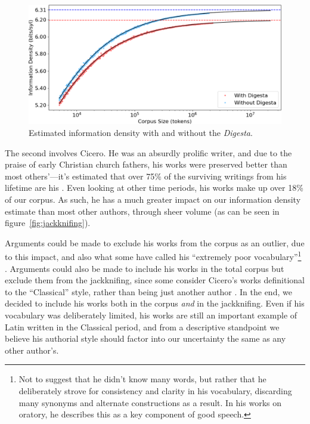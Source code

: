 \documentclass[12pt,twoside]{article}
\begin{document}
\begin{figure}[h]
\centering
\noindent\includegraphics[width=\linewidth]{digesta}
\caption{Estimated information density with and without the \emph{Digesta}.}
\label{fig:digesta}
\end{figure}

The second involves Cicero. He was an absurdly prolific writer, and due to the praise of early Christian church fathers, his works were preserved better than most others'---it's estimated that over 75\% of the surviving writings from his lifetime are his \citep{harrison}. Even looking at other time periods, his works make up over 18\% of our corpus. As such, he has a much greater impact on our information density estimate than most other authors, through sheer volume (as can be seen in figure~\ref{fig:jackknifing}).

Arguments could be made to exclude his works from the corpus as an outlier, due to this impact, and also what some have called his ``extremely poor vocabulary''\footnote{Not to suggest that he didn't know many words, but rather that he deliberately strove for consistency and clarity in his vocabulary, discarding many synonyms and alternate constructions as a result. In his works on oratory, he describes this as a key component of good speech.} \citep[136]{albrecht}. Arguments could also be made to include his works in the total corpus but exclude them from the jackknifing, since some consider Cicero's works definitional to the ``Classical'' style, rather than being just another author \citep[136]{albrecht}. In the end, we decided to include his works both in the corpus \emph{and} in the jackknifing. Even if his vocabulary was deliberately limited, his works are still an important example of Latin written in the Classical period, and from a descriptive standpoint we believe his authorial style should factor into our uncertainty the same as any other author's.
\end{document}
